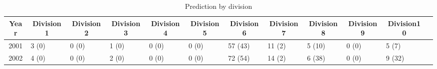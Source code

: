 \documentclass[12pt,letterpaper]{article}
\begin{document}
\begin{enumerate}
\begin{table}[h!]
	\centering
	\scriptsize
	\caption{Prediction by division}
	\begin{threeparttable}
		\begin{tabular}{clllllllllll}
			\toprule
			Year  & \multicolumn{1}{c}{Division1} & \multicolumn{1}{c}{Division2} & \multicolumn{1}{c}{Division3} & \multicolumn{1}{c}{Division4} & \multicolumn{1}{c}{Division5} & \multicolumn{1}{c}{Division6} & \multicolumn{1}{c}{Division7} & \multicolumn{1}{c}{Division8} & \multicolumn{1}{c}{Division9} & \multicolumn{1}{c}{Division10} \\
			\midrule
        2001  & 3\tnote{1} (0)\tnote{2} & 0 (0) & 1 (0) & 0 (0) & 0 (0) & 57 (43) & 11 (2) & 5 (10) & 0 (0) & 5 (7) \\
        2002  & 4 (0) & 0 (0) & 2 (0) & 0 (0) & 0 (0) & 72 (54) & 14 (2) & 6 (38) & 0 (0) & 9 (32) \\

\end{tabular}
\end{threeparttable}
\end{table}
\end{enumerate}
\end{document}
